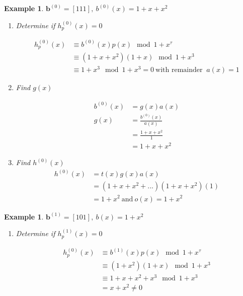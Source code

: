 \documentclass[conference]{IEEEtran}
\newtheorem{example}[theorem]{Example}
\begin{document}
\begin{example}
\label{ex1}
$\textbf{b}^{(0)}=[1 1 1 ],~b^{(0)}(x)=1+x+x^2$

\begin{enumerate}
\item Determine if $h_p^{(0)}(x) =0$

\begin{equation*}
\begin{split}
h_p^{(0)}(x)& \equiv b^{(0)}(x)p(x) \mod{1+x^{\tau}}\\
& \equiv (1+x+x^2)(1+x)  \mod{1+x^{3}}\\
&\equiv 1+x^3  \mod{1+x^{3}} =0 ~\text{with remainder }~ a(x) =1
\end{split}
\end{equation*}

\item Find $g(x)$
 
 \begin{equation*}
 \begin{split}
 b^{(0)}(x)&=g(x)a(x) \\
 g(x) &=\frac{b^{(0)}(x)}{a(x)}\\
 &=\frac{1+x+x^2}{1}\\
 &=1+x+x^2
 \end{split}
 \end{equation*}
 
 \item Find $h^{(0)}(x)$
 \begin{equation*}
 \begin{split}
 h^{(0)}(x)&=t(x)g(x)a(x) \\
 &=(1+x+x^2+...)(1+x+x^2)(1)\\
 &=1+x^2  ~\text{and}~ o(x)=1+x^2 
 \end{split}
 \end{equation*}
 
\end{enumerate}
\end{example}

\begin{example}
\label{ex2}
$\textbf{b}^{(1)}=[1 0 1],~ b(x)=1+x^2$

\begin{enumerate}
\item Determine if $h_p^{(1)}(x) =0$

\begin{equation*}
\begin{split}
h_p^{(0)}(x)& \equiv b^{(1)}(x)p(x) \mod{1+x^{\tau}}\\
& \equiv (1+x^2)(1+x)  \mod{1+x^{3}}\\
&\equiv 1+x+x^2+x^3  \mod{1+x^{3}}\\ &=x+x^2 \neq 0
\end{split}
\end{equation*}
\end{enumerate}
\end{example}
 
\end{document}
